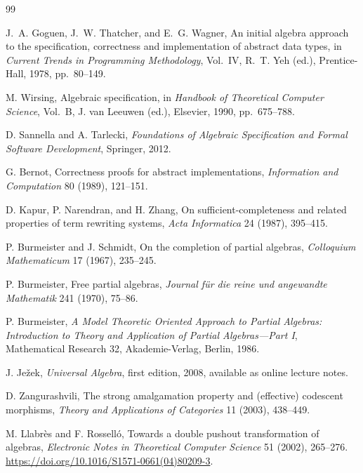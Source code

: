 \begin{thebibliography}{99}

J.~A. Goguen, J.~W. Thatcher, and E.~G. Wagner,
\newblock An initial algebra approach to the specification, correctness and implementation of abstract data types,
\newblock in \emph{Current Trends in Programming Methodology}, Vol.~IV, R.~T. Yeh (ed.), Prentice-Hall, 1978, pp.~80--149.

M. Wirsing,
\newblock Algebraic specification,
\newblock in \emph{Handbook of Theoretical Computer Science}, Vol.~B, J. van Leeuwen (ed.), Elsevier, 1990, pp.~675--788.

D. Sannella and A. Tarlecki,
\newblock \emph{Foundations of Algebraic Specification and Formal Software Development},
\newblock Springer, 2012.

G. Bernot,
\newblock Correctness proofs for abstract implementations,
\newblock \emph{Information and Computation} 80 (1989), 121--151.

D. Kapur, P. Narendran, and H. Zhang,
\newblock On sufficient-completeness and related properties of term rewriting systems,
\newblock \emph{Acta Informatica} 24 (1987), 395--415.

P. Burmeister and J. Schmidt,
\newblock On the completion of partial algebras,
\newblock \emph{Colloquium Mathematicum} 17 (1967), 235--245.

P. Burmeister,
\newblock Free partial algebras,
\newblock \emph{Journal f\"ur die reine und angewandte Mathematik} 241 (1970), 75--86.

P. Burmeister,
\newblock \emph{A Model Theoretic Oriented Approach to Partial Algebras: Introduction to Theory and Application of Partial Algebras---Part I},
\newblock Mathematical Research 32, Akademie-Verlag, Berlin, 1986.

J. Je\v{z}ek,
\newblock \emph{Universal Algebra}, first edition, 2008, available as online lecture notes.

D. Zangurashvili,
\newblock The strong amalgamation property and (effective) codescent morphisms,
\newblock \emph{Theory and Applications of Categories} 11 (2003), 438--449.

M. Llabr\`es and F. Rossell\'o,
\newblock Towards a double pushout transformation of algebras,
\newblock \emph{Electronic Notes in Theoretical Computer Science} 51 (2002), 265--276.
\newblock \url{https://doi.org/10.1016/S1571-0661(04)80209-3}.


\end{thebibliography}
